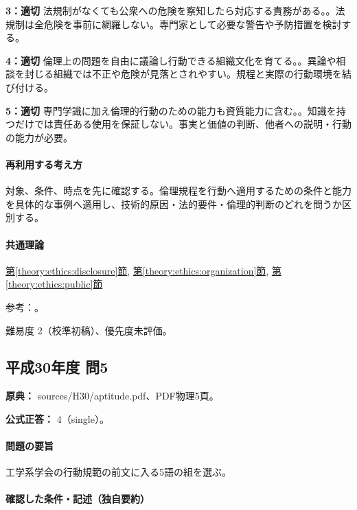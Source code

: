 \noindent\textbf{3：適切} 法規制がなくても公衆への危険を察知したら対応する責務がある。。法規制は全危険を事前に網羅しない。専門家として必要な警告や予防措置を検討する。\par

\noindent\textbf{4：適切} 倫理上の問題を自由に議論し行動できる組織文化を育てる。。異論や相談を封じる組織では不正や危険が見落とされやすい。規程と実際の行動環境を結び付ける。\par

\noindent\textbf{5：適切} 専門学識に加え倫理的行動のための能力も資質能力に含む。。知識を持つだけでは責任ある使用を保証しない。事実と価値の判断、他者への説明・行動の能力が必要。\par

\paragraph{再利用する考え方} 対象、条件、時点を先に確認する。倫理規程を行動へ適用するための条件と能力を具体的な事例へ適用し、技術的原因・法的要件・倫理的判断のどれを問うか区別する。

\paragraph{共通理論} \hyperref[theory:ethics:disclosure]{第\ref*{theory:ethics:disclosure}節}, \hyperref[theory:ethics:organization]{第\ref*{theory:ethics:organization}節}, \hyperref[theory:ethics:public]{第\ref*{theory:ethics:public}節}

\par 参考：\cite{ipej_ethics2011,ipej_ethics2023,mext_competency2014}。

\par 難易度 2（校準初稿）、優先度未評価。

\subsection{平成30年度 問5}
\label{q:h30-reg-apt-05}

\noindent\textbf{原典：} sources/H30/aptitude.pdf、PDF物理5頁。

\textbf{公式正答：} 4（single）。

\paragraph{問題の要旨} 工学系学会の行動規範の前文に入る5語の組を選ぶ。

\paragraph{確認した条件・記述（独自要約）}\mbox{}\par

